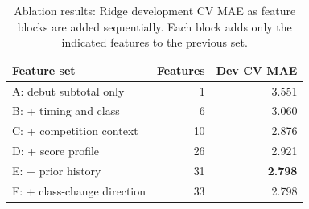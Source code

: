 \begin{table}[t]
\centering
\caption{Ablation results: Ridge development CV MAE as feature blocks are added sequentially. Each block adds only the indicated features to the previous set.}
\label{tab:ablation}
\small
\setlength{\tabcolsep}{4pt}
\begin{tabular}{lrr}
\toprule
Feature set & Features & Dev CV MAE \\
\midrule
A: debut subtotal only          &  1 & 3.551 \\
B: + timing and class           &  6 & 3.060 \\
C: + competition context        & 10 & 2.876 \\
D: + score profile              & 26 & 2.921 \\
E: + prior history              & 31 & \textbf{2.798} \\
F: + class-change direction      & 33 & 2.798 \\
\bottomrule
\end{tabular}
\end{table}
